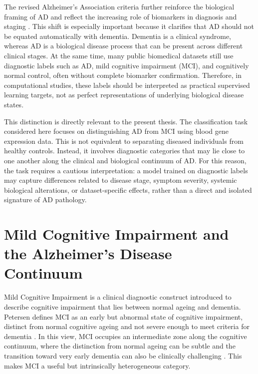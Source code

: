 The revised Alzheimer's Association criteria further reinforce the biological framing of AD and reflect the increasing role of biomarkers in diagnosis and staging \citep{jack2024revised}. This shift is especially important because it clarifies that AD should not be equated automatically with dementia. Dementia is a clinical syndrome, whereas AD is a biological disease process that can be present across different clinical stages. At the same time, many public biomedical datasets still use diagnostic labels such as AD, mild cognitive impairment (MCI), and cognitively normal control, often without complete biomarker confirmation. Therefore, in computational studies, these labels should be interpreted as practical supervised learning targets, not as perfect representations of underlying biological disease states.

This distinction is directly relevant to the present thesis. The classification task considered here focuses on distinguishing AD from MCI using blood gene expression data. This is not equivalent to separating diseased individuals from healthy controls. Instead, it involves diagnostic categories that may lie close to one another along the clinical and biological continuum of AD. For this reason, the task requires a cautious interpretation: a model trained on diagnostic labels may capture differences related to disease stage, symptom severity, systemic biological alterations, or dataset-specific effects, rather than a direct and isolated signature of AD pathology.

\section{Mild Cognitive Impairment and the Alzheimer's Disease Continuum}

Mild Cognitive Impairment is a clinical diagnostic construct introduced to describe cognitive impairment that lies between normal ageing and dementia. Petersen defines MCI as an early but abnormal state of cognitive impairment, distinct from normal cognitive ageing and not severe enough to meet criteria for dementia \citep{petersen2004mci}. In this view, MCI occupies an intermediate zone along the cognitive continuum, where the distinction from normal ageing can be subtle and the transition toward very early dementia can also be clinically challenging \citep{petersen2004mci}. This makes MCI a useful but intrinsically heterogeneous category.

